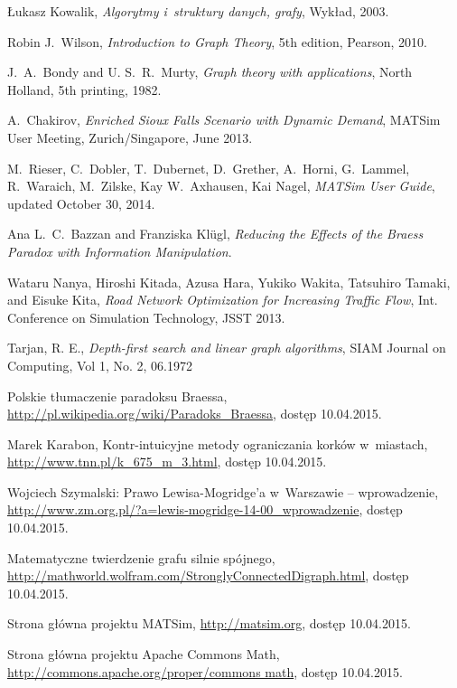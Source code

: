 \documentclass[twoside,12pt]{report}
\begin{document}
\begin{thebibliography}{99}
	Łukasz Kowalik,
	\textit{Algorytmy i~struktury danych, grafy},
	Wykład, 2003.
	
	Robin J.~Wilson,
	\textit{Introduction to Graph Theory},
	5th edition, Pearson, 2010.
	
	J.~A.~Bondy and U. S.~R.~Murty,
	\textit{Graph theory with applications},
	North Holland, 5th printing, 1982.
	
	A.~Chakirov,
	\textit{Enriched Sioux Falls Scenario with Dynamic Demand},
	MATSim User Meeting, Zurich/Singapore, June 2013.
		
	M.~Rieser, C.~Dobler, T.~Dubernet, D.~Grether, A.~Horni, G.~Lammel, R.~Waraich, M.~Zilske, Kay W.~Axhausen, Kai Nagel,
	\textit{MATSim User Guide},
	updated October 30, 2014.

	Ana L.~C.~Bazzan and Franziska Klügl,
	\textit{Reducing the Effects of the Braess Paradox with Information Manipulation}.

	Wataru Nanya, Hiroshi Kitada, Azusa Hara, Yukiko Wakita, Tatsuhiro Tamaki, and Eisuke Kita,
	\textit{Road Network Optimization for Increasing Traffic Flow},
	Int. Conference on Simulation Technology, JSST 2013.

	Tarjan, R. E.,
	\textit{Depth-first search and linear graph algorithms},
	SIAM Journal on Computing, Vol 1, No. 2, 06.1972
	
	Polskie tłumaczenie paradoksu Braessa,
	\url{http://pl.wikipedia.org/wiki/Paradoks_Braessa},
	dostęp 10.04.2015.
	
	Marek Karabon, Kontr-intuicyjne metody ograniczania korków w~miastach,
	\url{http://www.tnn.pl/k_675_m_3.html},
	dostęp 10.04.2015.
	
	Wojciech Szymalski: Prawo Lewisa-Mogridge’a w~Warszawie – wprowadzenie,
	\url{http://www.zm.org.pl/?a=lewis-mogridge-14-00_wprowadzenie},
	dostęp 10.04.2015.
	   
	Matematyczne twierdzenie grafu silnie spójnego,
	\url{http://mathworld.wolfram.com/StronglyConnectedDigraph.html},
	dostęp 10.04.2015.	

	Strona główna projektu MATSim,
	\url{http://matsim.org},
	dostęp 10.04.2015.

	Strona główna projektu Apache Commons Math,
	\url{http://commons.apache.org/proper/commons math},
	dostęp 10.04.2015.
	

\end{thebibliography}
\end{document}
